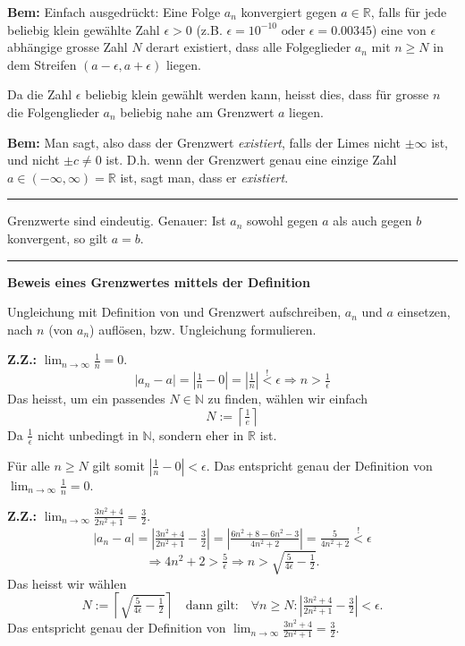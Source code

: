 \documentclass[a4paper,landscape,8pt]{extarticle}
\newcommand{\N}{\mathbb{N}}
\newcommand{\R}{\mathbb{R}}
\newcommand{\abs}[1]{\left\lvert #1 \right\rvert}
\newcommand{\ceil}[1]{\left\lceil #1 \right\rceil}
\newcommand{\sep}{\vspace{5pt}\noindent\hrule\vspace{5pt}}
\newcommand{\ZZ}{\textbf{Z.Z.: }}
\newcommand{\Bem}{\textbf{Bem: }}
\begin{document}
\begin{multicols*}{4}
\begin{warmup}
\Bem Einfach ausgedrückt: Eine Folge $a_n$ konvergiert gegen $a\in \R$, falls
für jede beliebig klein gewählte Zahl $\epsilon > 0$ (z.B. $\epsilon =
10^{-10} \text{ oder }\epsilon = 0.00345$) eine von $\epsilon$ abhängige grosse
Zahl $N$ derart existiert, dass alle Folgeglieder $a_n$ mit $n\geq N$ in dem
Streifen $(a-\epsilon,a+\epsilon)$ liegen.

Da die Zahl $\epsilon$ beliebig klein gewählt werden kann, heisst dies, dass für
grosse $n$ die Folgenglieder $a_n$ beliebig nahe am Grenzwert $a$ liegen.
\end{warmup}

\Bem Man sagt, also dass der Grenzwert \emph{existiert}, falls der
Limes nicht $\pm \infty$ ist, und nicht $\pm c \neq
0$ ist. D.h. wenn der Grenzwert genau eine einzige Zahl
$a\in(-\infty,\infty)=\R$ ist, sagt man, dass er \emph{existiert}.

\sep

\Satz Grenzwerte sind eindeutig. Genauer: Ist $a_n$ sowohl gegen $a$ als auch
gegen $b$ konvergent, so gilt $a=b$.

\sep

\textbf{Beweis eines Grenzwertes mittels der Definition}

\Vorgehen Ungleichung mit Definition von und Grenzwert aufschreiben, $a_n$ und
$a$ einsetzen, nach $n$ (von $a_n$) auflösen, bzw. Ungleichung formulieren.

\begin{warmup}
\Bsp \ZZ $\lim_{n\to\infty}\frac{1}{n}=0$.
\[
\abs{a_n - a}= \abs{\tfrac{1}{n} - 0} = \abs{\tfrac{1}{n}} \stackrel{!}{<}
\epsilon \Longrightarrow n > \tfrac{1}{\epsilon}
\]
Das heisst, um ein passendes $N\in \N$ zu finden, wählen wir einfach
\[
N := \ceil{\tfrac{1}{e}}
\]
Da $\tfrac{1}{\epsilon}$ nicht unbedingt in $\N$, sondern eher in $\R$ ist.

Für alle $n\geq N$ gilt somit $\abs{\frac{1}{n}-0}<\epsilon$. Das entspricht
genau der Definition von $\lim_{n\to\infty} \frac{1}{n}=0$.

\Bsp \ZZ $\lim_{n\to\infty} \frac{3n^2+4}{2n^2+1}=\frac{3}{2}$.
\[
\abs{a_n - a} = \abs{\tfrac{3n^2+4}{2n^2+1}-\tfrac{3}{2}}
= \abs{\tfrac{6n^2+8-6n^2-3}{4n^2+2}} 
= \tfrac{5}{4n^2+2} \stackrel{!}{<} \epsilon
\]
\[
\Longrightarrow 4n^2+2 > \tfrac{5}{\epsilon} \Longrightarrow n >
\sqrt{\tfrac{5}{4\epsilon}-\tfrac{1}{2}}.
\]
Das heisst wir wählen
\[
N:= \ceil{\sqrt{\tfrac{5}{4\epsilon}-\tfrac{1}{2}}} \quad \text{dann gilt:}
\quad
\forall n\geq N : \abs{\tfrac{3n^2+4}{2n^2+1}-\tfrac{3}{2}} < \epsilon.
\]
Das entspricht genau der Definition von $\lim_{n\to\infty}
\frac{3n^2+4}{2n^2+1}=\frac{3}{2}$.
\end{warmup}


\end{multicols*}
\end{document}
